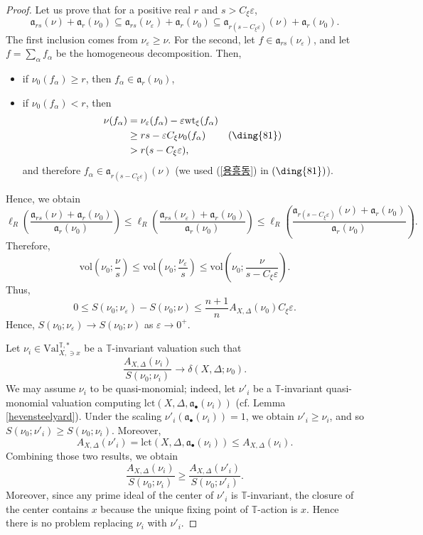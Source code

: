 \documentclass[a4paper,12pt]{amsart}
\theoremstyle{definition} %
\theoremstyle{remark}
\numberwithin{equation}{section}
\begin{document}
\begin{proof}
Let us prove that for a positive real $r$ and $s>C_{\xi}\varepsilon$,
$$ \mathfrak{a}_{rs}(\nu)+\mathfrak{a}_r(\nu_0)\subseteq \mathfrak{a}_{rs}(\nu_{\varepsilon})+\mathfrak{a}_r(\nu_0)\subseteq \mathfrak{a}_{r(s-C_{\xi}\varepsilon)}(\nu)+\mathfrak{a}_r(\nu_0).$$
The first inclusion comes from $\nu_{\varepsilon}\ge \nu$. For the second, let $f\in \mathfrak{a}_{rs}(\nu_{\varepsilon})$, and let $f=\sum_{\alpha}f_{\alpha}$ be the homogeneous decomposition. Then,
\begin{itemize}
    \item if $\nu_0(f_{\alpha})\ge r$, then $f_{\alpha}\in \mathfrak{a}_r(\nu_0)$,
    \item if $\nu_0(f_{\alpha})<r$, then
    $$ 
    \begin{aligned}
    \nu(f_{\alpha})&=\nu_{\varepsilon}(f_{\alpha})-\varepsilon \mathrm{wt}_{\xi}(f_{\alpha}) &
    \\ & \ge rs-\varepsilon C_{\xi}\nu_0(f_{\alpha}) & (\mbox{\ding{81}})
    \\ &>r(s-C_{\xi}\varepsilon), & 
    \end{aligned}$$
    and therefore $f_{\alpha}\in \mathfrak{a}_{r(s-C_{\xi}\varepsilon)}(\nu)$ (we used (\ref{용흥동}) in $(\mbox{\ding{81}})$).
\end{itemize}

Hence, we obtain
$$ \ell_R\left(\frac{\mathfrak{a}_{rs}(\nu)+\mathfrak{a}_r(\nu_0)}{\mathfrak{a}_r(\nu_0)}\right)\le \ell_R\left(\frac{\mathfrak{a}_{rs}(\nu_{\varepsilon})+\mathfrak{a}_r(\nu_0)}{\mathfrak{a}_r(\nu_0)}\right)\le \ell_R\left(\frac{\mathfrak{a}_{r(s-C_{\xi}\varepsilon)}(\nu)+\mathfrak{a}_r(\nu_0)}{\mathfrak{a}_r(\nu_0)}\right).$$
Therefore,
$$ \mathrm{vol}\left(\nu_0;\frac{\nu}{s}\right)\le \mathrm{vol}\left(\nu_0;\frac{\nu_{\varepsilon}}{s}\right)\le \mathrm{vol}\left(\nu_0;\frac{\nu}{s-C_{\xi}\varepsilon}\right).$$
Thus,
$$ 0\le S(\nu_0;\nu_{\varepsilon})-S(\nu_0;\nu)\le \frac{n+1}{n}A_{X,\Delta}(\nu_0)C_{\xi}\varepsilon.$$
Hence, $S(\nu_0;\nu_{\varepsilon})\to S(\nu_0;\nu)$ as $\varepsilon\to 0^+$.

\smallskip

Let $\nu_i\in \mathrm{Val}^{\mathbb{T},*}_{X,\ni x}$ be a $\mathbb{T}$-invariant valuation such that
$$ \frac{A_{X,\Delta}(\nu_i)}{S(\nu_0;\nu_i)}\to \delta(X,\Delta;\nu_0).$$ 
We may assume $\nu_i$ to be quasi-monomial; indeed, let $\nu'_i$ be a $\mathbb{T}$-invariant quasi-monomial valuation computing $\mathrm{lct}(X,\Delta,\mathfrak{a}_{\bullet}(\nu_i))$ (cf. Lemma \ref{hevensteelyard}). Under the scaling $\nu'_i(\mathfrak{a}_{\bullet}(\nu_i))=1$, we obtain $\nu'_i\ge \nu_i$, and so $S(\nu_0;\nu'_i)\ge S(\nu_0;\nu_i)$. Moreover,
$$ A_{X,\Delta}(\nu'_i)=\mathrm{lct}(X,\Delta,\mathfrak{a}_{\bullet}(\nu_i))\le A_{X,\Delta}(\nu_i).$$
Combining those two results, we obtain
$$ \frac{A_{X,\Delta}(\nu_i)}{S(\nu_0;\nu_i)}\ge \frac{A_{X,\Delta}(\nu'_i)}{S(\nu_0;\nu'_i)}.$$
Moreover, since any prime ideal of the center of $\nu'_i$ is $\mathbb{T}$-invariant, the closure of the center contains $x$ because the unique fixing point of $\mathbb{T}$-action is $x$. Hence there is no problem replacing $\nu_i$ with $\nu'_i$.


\end{proof}
\end{document}
